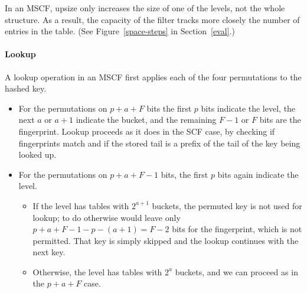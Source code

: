 \documentclass[letterpaper,twocolumn,10pt]{article}
\newcommand{\ints}{\mathbb{Z}}
\newcommand{\TCF}{SCF}
\newcommand{\MTCF}{MSCF}
\newcommand{\TCF}{TCF}
\newcommand{\MTCF}{MTCF}
\begin{document}
In an \MTCF{}, upsize only increases the size of one of the levels, not the whole structure.
As a result, the capacity of the filter tracks more closely the number of entries in the table. (See Figure~\ref{space-steps} in Section~\ref{eval}.)

\paragraph{Lookup}
A lookup operation in an \MTCF{} first applies each of the four permutations to the hashed key.
\begin{itemize}
\item For the permutations on $p + a + F$ bits %
the first $p$ bits indicate the level, %
the next $a$ or $a+1$ indicate the bucket, %
and the remaining $F-1$ or $F$ bits are the fingerprint.
Lookup proceeds as it does in the \TCF{} case, by checking if fingerprints match and if the stored tail is a prefix of the tail of the key being looked up. %
\item For the permutations on $p + a + F - 1$ bits, the first $p$ bits again indicate the level. %
\begin{itemize}
\item If the level has tables with $2^{a+1}$ buckets, the permuted key is not used for lookup; to do otherwise would leave only $p + a + F - 1 - p - (a+1) = F-2$ bits for the fingerprint, which is not permitted.
That key is simply skipped and the lookup continues with the next key. %
\item Otherwise, the level has tables with $2^a$ buckets, and we can proceed as in the $p+a+F$ case. %
\end{itemize}
\end{itemize}

\end{document}
